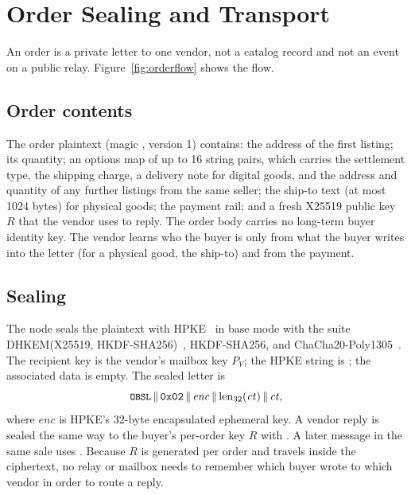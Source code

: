 \section{Order Sealing and Transport}
\label{sec:orders}



An order is a private letter to one vendor, not a catalog record and not an event on a public relay. Figure~\ref{fig:orderflow} shows the flow.

\subsection{Order contents}

The order plaintext (magic , version 1) contains: the address of the first listing; its quantity; an options map of up to 16 string pairs, which carries the settlement type, the shipping charge, a delivery note for digital goods, and the address and quantity of any further listings from the same seller; the ship-to text (at most 1024 bytes) for physical goods; the payment rail; and a fresh X25519 public key $R$ that the vendor uses to reply. The order body carries no long-term buyer identity key. The vendor learns who the buyer is only from what the buyer writes into the letter (for a physical good, the ship-to) and from the payment.

\subsection{Sealing}

The node seals the plaintext with HPKE~\citep{rfc9180} in base mode with the suite DHKEM(X25519, HKDF-SHA256)~\citep{rfc7748,rfc5869}, HKDF-SHA256, and ChaCha20-Poly1305~\citep{rfc8439}. The recipient key is the vendor's mailbox key $P_V$; the HPKE  string is ; the associated data is empty. The sealed letter is
\[
  \texttt{\small OBSL} \,\|\, \mathtt{0x02} \,\|\, \mathit{enc} \,\|\, \mathrm{len}_{32}(\mathit{ct}) \,\|\, \mathit{ct},
\]
where $\mathit{enc}$ is HPKE's 32-byte encapsulated ephemeral key. A vendor reply is sealed the same way to the buyer's per-order key $R$ with  . A later message in the same sale uses . Because $R$ is generated per order and travels inside the ciphertext, no relay or mailbox needs to remember which buyer wrote to which vendor in order to route a reply.


